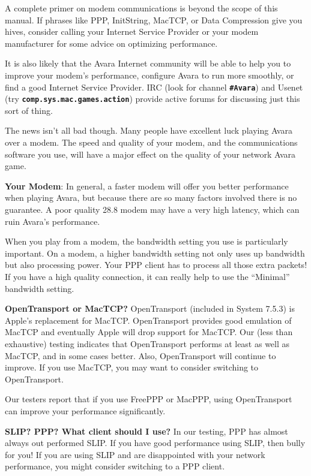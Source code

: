 \documentclass{article}
\begin{document}
A complete primer on modem communications is beyond the scope of this manual. If phrases like PPP, InitString, MacTCP, or Data Compression give you hives, consider calling your Internet Service Provider or your modem manufacturer for some advice on optimizing performance.

It is also likely that the Avara Internet community will be able to help you to improve your modem's performance, configure Avara to run more smoothly, or find a good Internet Service Provider. IRC (look for channel \textbf{\texttt{\#Avara}}) and Usenet (try \textbf{\texttt{comp.sys.mac.games.action}}) provide active forums for discussing just this sort of thing.

The news isn't all bad though. Many people have excellent luck playing Avara over a modem. The speed and quality of your modem, and the communications software you use, will have a major effect on the quality of your network Avara game.

\textbf{Your Modem}: In general, a faster modem will offer you better performance when playing Avara, but because there are so many factors involved there is no guarantee. A poor quality 28.8 modem may have a very high latency, which can ruin Avara's performance.

When you play from a modem, the bandwidth setting you use is particularly important. On a modem, a higher bandwidth setting not only uses up bandwidth but also processing power. Your PPP client has to process all those extra packets! If you have a high quality connection, it can really help to use the ``Minimal'' bandwidth setting.

\textbf{OpenTransport or MacTCP?} OpenTransport (included in System 7.5.3) is Apple's replacement for MacTCP. OpenTransport provides good emulation of MacTCP and eventually Apple will drop support for MacTCP. Our (less than exhaustive) testing indicates that OpenTransport performs at least as well as MacTCP, and in some cases better. Also, OpenTransport will continue to improve. If you use MacTCP, you may want to consider switching to OpenTransport.

Our testers report that if you use FreePPP or MacPPP, using OpenTransport can improve your performance significantly.

\textbf{SLIP? PPP? What client should I use?} In our testing, PPP has almost always out performed SLIP. If you have good performance using SLIP, then bully for you! If you are using SLIP and are disappointed with your network performance, you might consider switching to a PPP client.
\end{document}
